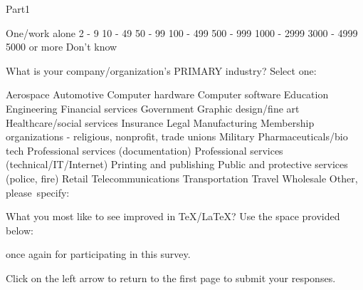 \documentclass{article}
\begin{document}
\begin{exam}{Part1}
\begin{problem}
\setlength\columnseprule{0pt}
\begin{multicols}{3}
\begin{answers}{1}
    \bChoices
         One/work alone\eAns
         2 - 9\eAns
         10 - 49\eAns
         50 - 99\eAns
         100 - 499\eAns
         500 - 999\eAns
         1000 - 2999\eAns
         3000 - 4999\eAns
         5000 or more\eAns
         Don't know\eAns
    \eChoices
\end{answers}
\end{multicols}
\end{problem}

\begin{problem}\label{buss2}
What is your company/organization's PRIMARY industry? Select one:

\setlength\columnseprule{0pt}

\begin{multicols}{2}
\begin{answers}{1}
    \bChoices
         Aerospace\eAns
         Automotive\eAns
         Computer hardware\eAns
         Computer software\eAns
         Education\eAns
         Engineering\eAns
         Financial services\eAns
         Government\eAns
         Graphic design/fine art\eAns
         Healthcare/social services\eAns
         Insurance\eAns
         Legal\eAns
         Manufacturing\eAns
         Membership organizations - religious, nonprofit, trade unions\eAns
         Military\eAns
         Pharmaceuticals/bio tech\eAns
         Professional services (documentation)\eAns
         Professional services (technical/IT/Internet)\eAns
         Printing and publishing\eAns
         Public and protective services (police, fire)\eAns
         Retail\eAns
         Telecommunications\eAns
         Transportation\eAns
         Travel\eAns
         Wholesale\eAns
         Other, \mbox{please specify: \fillin{1.25in}{\empty}}\eAns
    \eChoices
\end{answers}
\end{multicols}
\end{problem}

\begin{eqComments}\end{eqComments}

\begin{problem}
What you most like to see improved in \TeX/\LaTeX? Use the space provided
below:
\begin{solution}[2in]
\end{solution}
\end{problem}


\begin{eqComments} once again for participating in this survey.\end{eqComments}
\begin{eqComments}[\GoToSubmit]
Click on the left arrow to return to the first page to submit your responses.\end{eqComments}



\end{exam}
\end{document}
